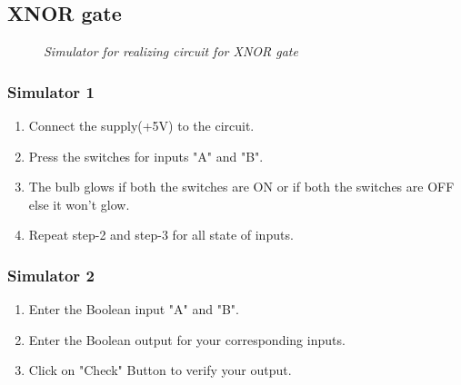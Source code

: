 	\subsection{XNOR gate}
		\begin{figure}[ht]
			\centering 
			\hfill
			\caption{\textit{Simulator for realizing circuit for XNOR gate}}
		\end{figure}
		\subsubsection{Simulator 1}
			\begin{enumerate}
				\tightlist
				\item Connect the supply(+5V) to the circuit.
				\item Press the switches for inputs "A" and "B".			
				\item The bulb glows if both the switches are ON or if both the switches are OFF else it won't glow.
				\item Repeat step-2 and step-3 for all state of inputs.
			\end{enumerate}
		\subsubsection{Simulator 2}
			\begin{enumerate}
				\tightlist
				\item Enter the Boolean input "A" and "B".
				\item Enter the Boolean output for your corresponding inputs.
				\item Click on "Check" Button to verify your output.			
			\end{enumerate}

